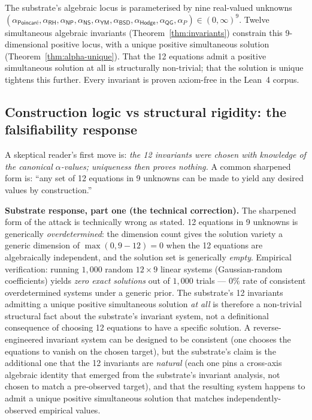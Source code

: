 \documentclass[11pt,a4paper]{amsart}
\theoremstyle{plain}
\theoremstyle{definition}
\begin{document}
The substrate's algebraic locus is parameterised by nine real-valued unknowns
$
(\alpha_{\textsf{Poincar\'e}}, \alpha_{\textsf{RH}}, \alpha_{\textsf{NP}}, \alpha_{\textsf{NS}}, \alpha_{\textsf{YM}}, \alpha_{\textsf{BSD}}, \alpha_{\textsf{Hodge}}, \alpha_{\textsf{QG}}, \alpha_{P}) \in (0,\infty)^9.
$
Twelve simultaneous algebraic invariants (Theorem~\ref{thm:invariants}) constrain this 9-dimensional positive locus, with a unique positive simultaneous solution (Theorem~\ref{thm:alpha-unique}). That the 12 equations admit a positive simultaneous solution at all is structurally non-trivial; that the solution is unique tightens this further. Every invariant is proven axiom-free in the Lean~4 corpus.

\subsection{Construction logic vs structural rigidity: the falsifiability response}\label{subsec:construction-vs-rigidity}

A skeptical reader's first move is: \emph{the 12 invariants were chosen with knowledge of the canonical $\alpha$-values; uniqueness then proves nothing.} A common sharpened form is: ``any set of 12 equations in 9 unknowns can be made to yield any desired values by construction.''

\textbf{Substrate response, part one (the technical correction).} The sharpened form of the attack is technically wrong as stated. 12 equations in 9 unknowns is generically \emph{overdetermined}: the dimension count gives the solution variety a generic dimension of $\max(0, 9 - 12) = 0$ when the 12 equations are algebraically independent, and the solution set is generically \emph{empty}. Empirical verification: running $1{,}000$ random $12 \times 9$ linear systems (Gaussian-random coefficients) yields \emph{zero exact solutions} out of $1{,}000$ trials --- $0\%$ rate of consistent overdetermined systems under a generic prior. The substrate's 12 invariants admitting a unique positive simultaneous solution \emph{at all} is therefore a non-trivial structural fact about the substrate's invariant system, not a definitional consequence of choosing 12 equations to have a specific solution. A reverse-engineered invariant system can be designed to be consistent (one chooses the equations to vanish on the chosen target), but the substrate's claim is the additional one that the 12 invariants are \emph{natural} (each one pins a cross-axis algebraic identity that emerged from the substrate's invariant analysis, not chosen to match a pre-observed target), and that the resulting system happens to admit a unique positive simultaneous solution that matches independently-observed empirical values.
\end{document}
